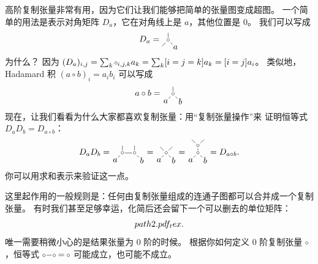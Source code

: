 高阶复制张量非常有用，因为它们让我们能够把简单的张量图变成超图。
一个简单的用法是表示对角矩阵 $D_a$，它在对角线上是 $a$，其他位置是 0。
我们可以写成
\[
   D_a = 
   \begin{tikzpicture}[baseline=(T.base), inner sep=1pt]
      \node (T) {$\sbullet$};
      \node (x) at (.3,-.3) {$a$};
      \draw (T) -- (x);
      \draw (T) -- ++(-.25,-.25);
      \draw (T) -- ++(0,.3);
   \end{tikzpicture}
\]
为什么？
因为 $(D_a)_{i,j} = \sum_k \sbullet_{i,j,k} a_k = \sum_k [i=j=k] a_k = [i=j] a_i$。
类似地，Hadamard 积 $(a\circ b)_i = a_i b_i$ 可以写成
\[
   a \circ b =
   \begin{tikzpicture}[baseline=(T.base), inner sep=1pt]
      \node (T) {$\sbullet$};
      \node (a) at (-.3,-.3) {$a$};
      \node (b) at (.3,-.3) {$b$};
      \draw (T) -- (a);
      \draw (T) -- (b);
      \draw (T) -- ++(0,.3);
   \end{tikzpicture}
\]
现在，让我们看看为什么大家都喜欢复制张量：用“复制张量操作”来
证明恒等式 $D_aD_b = D_{a\circ b}$：
\[
   D_a D_b =
   \begin{tikzpicture}[baseline=(T.base), inner sep=1pt]
      \node (T) {$\sbullet$};
      \node (a) at (-.3,-.3) {$a$};
      \draw (T) -- (a);
      \node (T2) at (.5,0) {$\sbullet$};
      \node (b) at (.8,-.3) {$b$};
      \draw (T) -- ++(0,.3);
      \draw (T) -- (T2);
      \draw (T2) -- (b);
      \draw (T2) -- ++(0,.3);
   \end{tikzpicture}
   =
   \begin{tikzpicture}[baseline=(T.base), inner sep=1pt]
      \node (T) {$\sbullet$};
      \node (a) at (-.3,-.3) {$a$};
      \node (b) at (.3,-.3) {$b$};
      \draw (T) -- (a);
      \draw (T) -- (b);
      \draw (T) -- ++(.25,.25);
      \draw (T) -- ++(-.25,.25);
   \end{tikzpicture}
   =
   \begin{tikzpicture}[baseline=(T.base), inner sep=1pt]
      \node (T) {$\sbullet$};
      \node (a) at (-.3,-.3) {$a$};
      \node (b) at (.3,-.3) {$b$};
      \draw (T) -- (a);
      \draw (T) -- (b);
      \node (T2) at (0,.3) {$\sbullet$};
      \draw (T) -- (T2);
      \draw (T2) -- ++(.25,.25);
      \draw (T2) -- ++(-.25,.25);
   \end{tikzpicture}
   =
   D_{a\circ b}.
\]
你可以用求和表示来验证这一点。

这里起作用的一般规则是：任何由复制张量组成的连通子图都可以合并成一个复制张量。
有时我们甚至足够幸运，化简后还会留下一个可以删去的单位矩阵：
\[
   \def\svgwidth{.75\linewidth}
   {path2.pdf_tex}
   .
\]
唯一需要稍微小心的是结果张量为 0 阶的时候。
根据你如何定义 0 阶复制张量 $\sbullet$，恒等式 $\sbullet\!-\!\sbullet = \sbullet$ 可能成立，也可能不成立。

